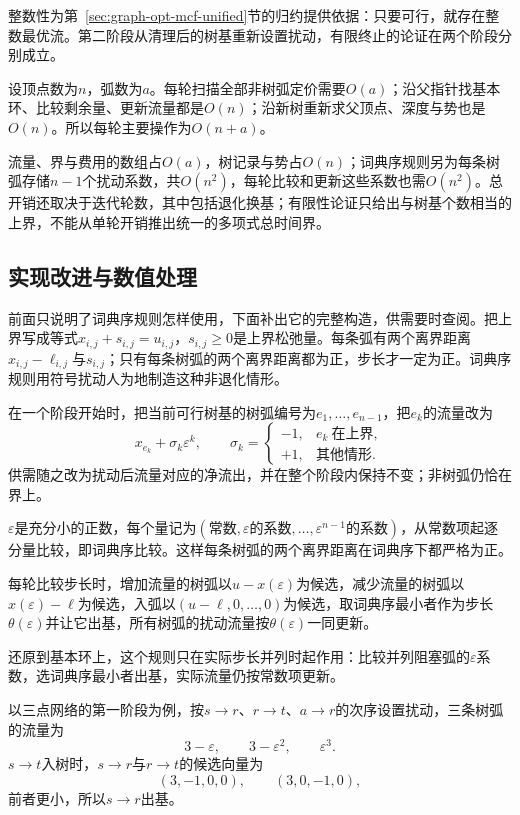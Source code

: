 整数性为第~\ref{sec:graph-opt-mcf-unified}节的归约提供依据：只要可行，就存在整数最优流。第二阶段从清理后的树基重新设置扰动，有限终止的论证在两个阶段分别成立。

设顶点数为$n$，弧数为$a$。每轮扫描全部非树弧定价需要$O(a)$；沿父指针找基本环、比较剩余量、更新流量都是$O(n)$；沿新树重新求父顶点、深度与势也是$O(n)$。所以每轮主要操作为$O(n+a)$。

流量、界与费用的数组占$O(a)$，树记录与势占$O(n)$；词典序规则另为每条树弧存储$n-1$个扰动系数，共$O(n^2)$，每轮比较和更新这些系数也需$O(n^2)$。总开销还取决于迭代轮数，其中包括退化换基；有限性论证只给出与树基个数相当的上界，不能从单轮开销推出统一的多项式总时间界。

\subsection{实现改进与数值处理}
\label{sec:graph-opt-ns-improvements}

前面只说明了词典序规则怎样使用，下面补出它的完整构造，供需要时查阅。把上界写成等式$x_{i,j}+s_{i,j}=u_{i,j}$，$s_{i,j}\geq0$是上界松弛量。每条弧有两个离界距离$x_{i,j}-\ell_{i,j}$与$s_{i,j}$；只有每条树弧的两个离界距离都为正，步长才一定为正。词典序规则用符号扰动人为地制造这种非退化情形。

在一个阶段开始时，把当前可行树基的树弧编号为$e_1,\ldots,e_{n-1}$，把$e_k$的流量改为
\[
  x_{e_k}+\sigma_k\varepsilon^k,\qquad
  \sigma_k=\begin{cases}-1,& e_k\ \text{在上界},\\ +1,& \text{其他情形}.\end{cases}
\]
供需随之改为扰动后流量对应的净流出，并在整个阶段内保持不变；非树弧仍恰在界上。

$\varepsilon$是充分小的正数，每个量记为$(\text{常数},\varepsilon\text{的系数},\ldots,\varepsilon^{n-1}\text{的系数})$，从常数项起逐分量比较，即词典序比较。这样每条树弧的两个离界距离在词典序下都严格为正。

每轮比较步长时，增加流量的树弧以$u-x(\varepsilon)$为候选，减少流量的树弧以$x(\varepsilon)-\ell$为候选，入弧以$(u-\ell,0,\ldots,0)$为候选，取词典序最小者作为步长$\theta(\varepsilon)$并让它出基，所有树弧的扰动流量按$\theta(\varepsilon)$一同更新。

还原到基本环上，这个规则只在实际步长并列时起作用：比较并列阻塞弧的$\varepsilon$系数，选词典序最小者出基，实际流量仍按常数项更新。

以三点网络的第一阶段为例，按$s\to r$、$r\to t$、$a\to r$的次序设置扰动，三条树弧的流量为
\[
  3-\varepsilon,\qquad 3-\varepsilon^2,\qquad \varepsilon^3.
\]
$s\to t$入树时，$s\to r$与$r\to t$的候选向量为
\[
  (3,-1,0,0),\qquad (3,0,-1,0),
\]
前者更小，所以$s\to r$出基。

